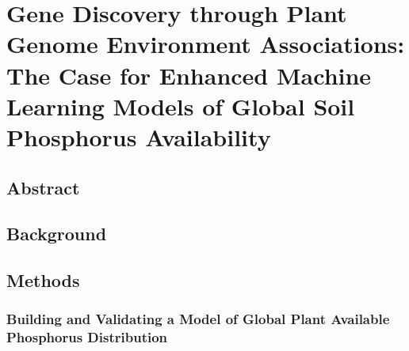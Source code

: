 \chapter{Gene Discovery through Plant Genome Environment Associations:
The Case for Enhanced Machine Learning Models of Global Soil Phosphorus Availability}
\label{chap-two}

\newrefsection

\section{Abstract}

\section{Background}

\section{Methods}
\subsection*{Building and Validating a Model of Global Plant Available Phosphorus Distribution }

